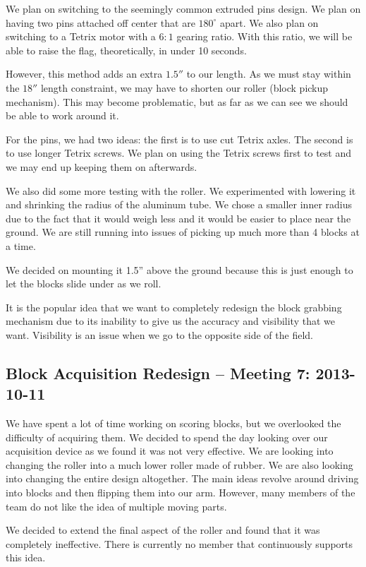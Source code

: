 We plan on switching to the seemingly common extruded pins design. We plan on having two pins attached off center that are $180^\circ$ apart. We also plan on switching to a Tetrix motor with a $6:1$ gearing ratio. With this ratio, we will be able to raise the flag, theoretically, in under 10 seconds. 

However, this method adds an extra $1.5''$ to our length. As we must stay within the $18''$ length constraint, we may have to shorten our roller (block pickup mechanism). This may become problematic, but as far as we can see we should be able to work around it. 

For the pins, we had two ideas: the first is to use cut Tetrix axles. The second is to use longer Tetrix screws. We plan on using the Tetrix screws first to test and we may end up keeping them on afterwards. 

We also did some more testing with the roller. We experimented with lowering it and shrinking the radius of the aluminum tube. We chose a smaller inner radius due to the fact that it would weigh less and it would be easier to place near the ground. We are still running into issues of picking up much more than 4 blocks at a time. 

We decided on mounting it 1.5'' above the ground because this is just enough to let the blocks slide under as we roll. 

It is the popular idea that we want to completely redesign the block grabbing mechanism due to its inability to give us the accuracy and visibility that we want. Visibility is an issue when we go to the opposite side of the field. 

\newpage \subsection{Block Acquisition Redesign -- Meeting 7: 2013-10-11}
We have spent a lot of time working on scoring blocks, but we overlooked the difficulty of acquiring them. We decided to spend the day looking over our acquisition device as we found it was not very effective. We are looking into changing the roller into a much lower roller made of rubber. We are also looking into changing the entire design altogether. The main ideas revolve around driving into blocks and then flipping them into our arm. However, many members of the team do not like the idea of multiple moving parts. 

We decided to extend the final aspect of the roller and found that it was completely ineffective. There is currently no member that continuously supports this idea. 

